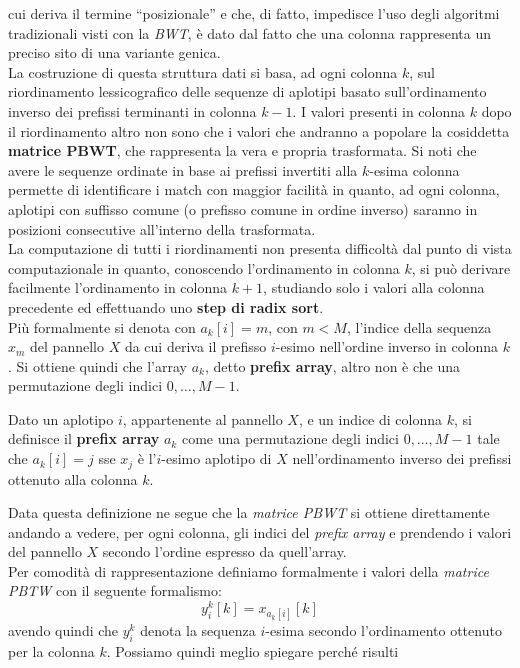 cui deriva il termine ``posizionale'' e che, di fatto, impedisce l'uso degli
algoritmi tradizionali visti con la \textit{BWT}, è dato dal fatto che una
colonna rappresenta un preciso sito di una variante genica. \\
La costruzione di questa struttura dati si basa, ad ogni colonna $k$, sul
riordinamento lessicografico delle sequenze di aplotipi basato sull'ordinamento
inverso dei prefissi terminanti in colonna $k-1$. I valori presenti in colonna
$k$ dopo il riordinamento altro non sono che i valori che andranno a popolare la
cosiddetta \textbf{matrice PBWT}, che rappresenta la vera e propria
trasformata. Si noti che avere le sequenze 
ordinate in base ai prefissi invertiti alla $k$-esima colonna permette di
identificare i match con maggior facilità in quanto, ad ogni colonna, aplotipi
con suffisso comune (o prefisso comune in ordine inverso) saranno in posizioni
consecutive all'interno della trasformata.\\
La computazione di tutti i riordinamenti non presenta difficoltà dal punto di
vista computazionale in quanto, conoscendo l'ordinamento in colonna $k$, si può
derivare facilmente l'ordinamento in colonna $k+1$, studiando solo i valori alla
colonna precedente ed effettuando uno \textbf{step di radix sort}.\\
Più formalmente si denota con $a_k[i]=m$, con $m<M$, l'indice della sequenza
$x_m$ del pannello $X$ da cui deriva il prefisso $i$-esimo nell'ordine inverso
in colonna $k$. Si ottiene quindi che l'array $a_k$, detto \textbf{prefix
  array}, altro non è che una permutazione degli indici $0,\ldots,M-1$.
\begin{definizione}
  Dato un aplotipo $i$, appartenente al pannello $X$, e un indice di colonna
  $k$, si definisce il \textbf{prefix array} $a_k$ come una permutazione degli
  indici $0,\ldots, M-1$ tale che $a_k[i]=j$ sse $x_j$ è l'$i$-esimo aplotipo di
  $X$ nell'ordinamento inverso dei prefissi ottenuto alla colonna $k$.
\end{definizione}
Data questa definizione ne segue che la \textit{matrice PBWT} si ottiene
direttamente andando a vedere, per ogni colonna, gli indici del \textit{prefix
  array} e prendendo i valori del pannello $X$ secondo l'ordine espresso da
quell'array.\\ 
Per comodità di rappresentazione definiamo formalmente i valori della
\textit{matrice PBTW} con il seguente formalismo:
\[y_i^k[k]=x_{a_k[i]}[k]\]
avendo quindi che $y_i^k$ denota la sequenza $i$-esima secondo l'ordinamento
ottenuto per la colonna $k$. Possiamo quindi meglio spiegare perché risulti
